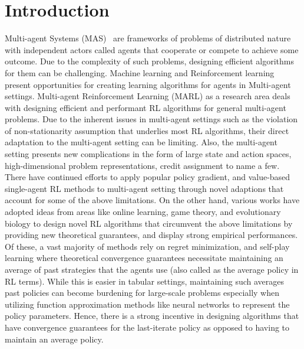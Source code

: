 \chapter{Introduction}

Multi-agent Systems (MAS)~\cite{tuylsMultiagent2012} are frameworks of problems of distributed
nature with independent actors called agents that cooperate or compete to achieve some outcome.
Due to the complexity of such problems, designing efficient algorithms for them can be challenging.
Machine learning and Reinforcement learning present opportunities for creating learning algorithms
for agents in Multi-agent settings.
Multi-agent Reinforcement Learning (MARL) as a research area deals with designing efficient and
performant RL algorithms for general multi-agent problems.
Due to the inherent issues in multi-agent settings such as the violation of non-stationarity assumption that underlies most RL algorithms, their direct adaptation to the multi-agent setting
can be limiting.
Also, the multi-agent setting presents new complications in the form of large state and action
spaces, high-dimensional problem representations, credit assignment to name a few.
There have continued efforts to apply popular policy gradient, and value-based single-agent RL
methods to multi-agent setting through novel adaptions that account for some of the above
limitations.
On the other hand, various works have adopted ideas from areas like online learning, game theory,
and evolutionary biology to design novel RL algorithms that circumvent the above limitations by
providing new theoretical guarantees, and display strong empirical performances.
Of these, a vast majority of methods rely on regret minimization, and self-play learning where
theoretical convergence guarantees necessitate maintaining an average of past strategies that the
agents use (also called as the average policy in RL terms).
While this is easier in tabular settings, maintaining such averages past policies can become
burdening for large-scale problems especially when utilizing function approximation methods like
neural networks to represent the policy parameters.
Hence, there is a strong incentive in designing algorithms that have convergence guarantees for the
last-iterate policy as opposed to having to maintain an average policy.

